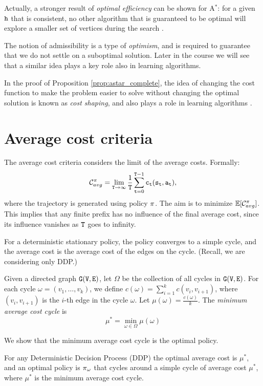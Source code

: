 \begin{remark}
    Actually, a stronger result of \textit{optimal efficiency} can be shown for A$^*$: for a given ${\tt h}$ that is consistent, no other algorithm that is guaranteed to be optimal will explore a smaller set of vertices during the search \cite{hart1968formal}.
\end{remark}
\begin{remark}
    The notion of admissibility is a type of \emph{optimism}, and is required to guarantee that we do not settle on a suboptimal solution. Later in the course we will see that a similar idea plays a key role also in learning algorithms. 
\end{remark}
\begin{remark}
    In the proof of Proposition \ref{prop:astar_complete}, the idea of changing the cost function to make the problem easier to solve without changing the optimal solution is known as \textit{cost shaping}, and also plays a role in learning algorithms \cite{ng1999policy}.
\end{remark}

\section{Average cost criteria}
\label{sec:ddp-avg-cost}

The average cost criteria considers the limit of the average costs.
Formally:
\[
\mathcal{C}_{avg}^\pi=\lim_{{\tt T}\rightarrow \infty}
\frac{1}{{\tt T}} \sum_{{\tt t}=0}^{{\tt T}-1}
{\tt c}_{\tt t}({\tt s}_{\tt t},{\tt a}_{\tt t}),
\]
where the trajectory is generated using policy $\pi$. The aim is to
minimize $\mathbb{E}[\mathcal{C}^\pi_{avg}]$. This implies that any finite
prefix has no influence of the final average cost, since its
influence vanishes as ${\tt T}$ goes to infinity.

For a deterministic stationary policy, the policy converges to a
simple cycle, and the average cost is the average cost of the edges
on the cycle. (Recall, we are considering only DDP.)

Given a directed graph ${\tt G}({\tt V},{\tt E})$, let $\Omega$ be the collection of
all cycles in ${\tt G}({\tt V},{\tt E})$. For each cycle $\omega=(v_1, \ldots ,
v_{k})$, we define $c(\omega)=\sum_{i=1}^k c(v_i,v_{i+1})$, where
$(v_i,v_{i+1})$ is the $i$-th edge in the cycle $\omega$. Let
$\mu(\omega)=\frac{c(\omega)}{k}$. The {\em minimum average cost cycle}
is
\[
\mu^*=\min_{\omega\in\Omega} \mu(\omega)
\]

We show that the minimum average cost cycle is the optimal policy.
\begin{theorem}
For any Deterministic Decision Process (DDP) the optimal average
cost is $\mu^*$, and an optimal policy is $\pi_{\omega}$ that
cycles around a simple cycle of average cost $\mu^*$, where $\mu^*$ is the minimum average cost cycle.
\end{theorem}

